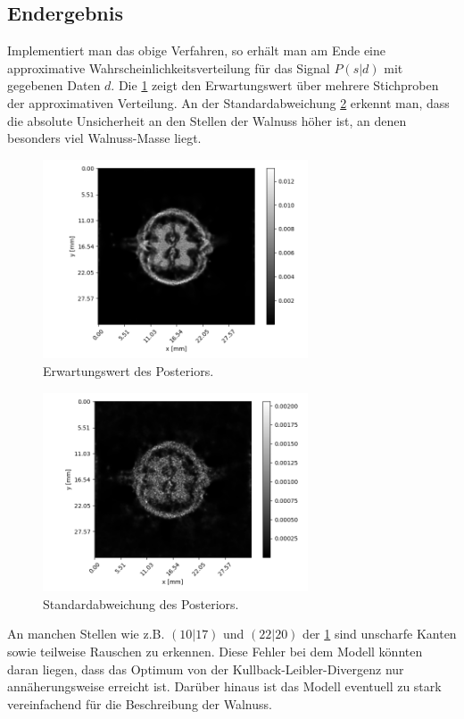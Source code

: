 \subsection{Endergebnis}

Implementiert man das obige Verfahren, so erhält man am Ende eine approximative Wahrscheinlichkeitsverteilung für das Signal $P(s|d)$ mit gegebenen Daten $d$. Die \cref{k4.2.fig.ct.mean} zeigt den Erwartungswert über mehrere Stichproben der approximativen Verteilung. An der Standardabweichung \cref{k4.2.fig.ct.std} erkennt man, dass die absolute Unsicherheit an den Stellen der Walnuss höher ist, an denen besonders viel Walnuss-Masse liegt. 

\begin{figure}
  \centering
  \includegraphics[width=0.7\textwidth]{k4.2/ct-walnuss-mean.png}
  \caption{Erwartungswert des Posteriors.}
  \label{k4.2.fig.ct.mean}
\end{figure}

\begin{figure}
  \centering
  \includegraphics[width=0.7\textwidth]{k4.2/ct-walnuss-std.png}
  \caption{Standardabweichung des Posteriors.}
  \label{k4.2.fig.ct.std}
\end{figure}

An manchen Stellen wie z.B. $(10|17)$ und $(22|20)$ der \cref{k4.2.fig.ct.mean} sind unscharfe Kanten sowie teilweise Rauschen zu erkennen. Diese Fehler bei dem Modell könnten daran liegen, dass das Optimum von der Kullback-Leibler-Divergenz nur annäherungsweise erreicht ist. Darüber hinaus ist das Modell eventuell zu stark vereinfachend für die Beschreibung der Walnuss. 
